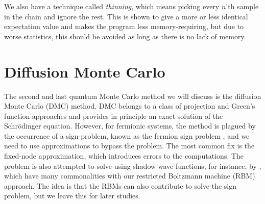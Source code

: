 We also have a technique called \textit{thinning}, which means picking every $n$'th sample in the chain and ignore the rest. This is shown to give a more or less identical expectation value and makes the program less memory-requiring, but due to worse statistics, this should be avoided as long as there is no lack of memory. 

\section{Diffusion Monte Carlo} \label{sec:dmc}
The second and last quantum Monte Carlo method we will discuss is the diffusion Monte Carlo (DMC) method. DMC belongs to a class of projection and Green's function approaches and provides in principle an exact solution of the Schrödinger equation. However, for fermionic systems, the method is plagued by the occurrence of a sign-problem, known as the fermion sign problem \cite{troyer_computational_2005}, and we need to use approximations to bypass the problem. The most common fix is the fixed-node approximation, which introduces errors to the computations. The problem is also attempted to solve using shadow wave functions, for instance, by \citet{calcavecchia_sign_2014}, which have many commonalities with our restricted Boltzmann machine (RBM) approach. The idea is that the RBMs can also contribute to solve the sign problem, but we leave this for later studies. 

